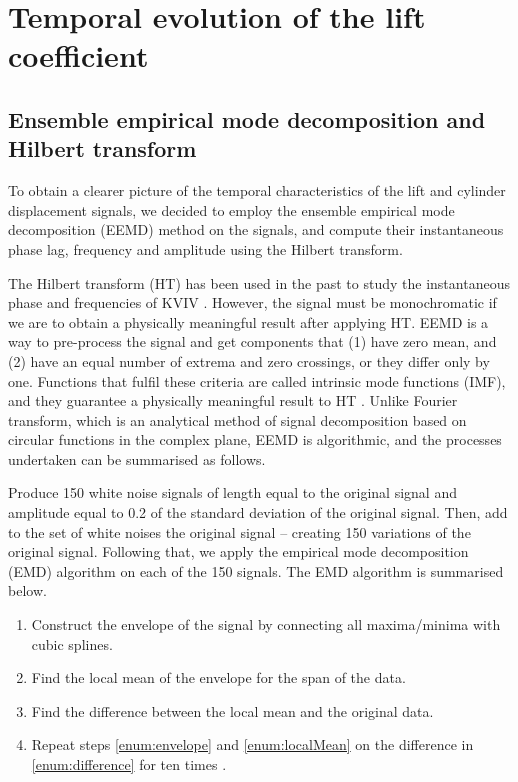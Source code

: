 \documentclass[oneside]{utmthesis}
\begin{document}
\chapter{Temporal evolution of the lift coefficient} \label{chap:tempEvo}

\section{Ensemble empirical mode decomposition and Hilbert transform} \label{sec:eemd}
To obtain a clearer picture of the temporal characteristics of the lift and cylinder displacement signals, we decided to employ the ensemble empirical mode decomposition (EEMD) method \citep{Huang1998,Wu2008} on the signals, and compute their instantaneous phase lag, frequency and amplitude using the Hilbert transform.

The Hilbert transform (HT) has been used in the past to study the instantaneous phase and frequencies of KVIV \citep{Khalak1999}. However, the signal must be monochromatic if we are to obtain a physically meaningful result after applying HT. EEMD is a way to pre-process the signal and get components that (1) have zero mean, and (2) have an equal number of extrema and zero crossings, or they differ only by one. Functions that fulfil these criteria are called intrinsic mode functions (IMF), and they guarantee a physically meaningful result to HT \citep{Gumelar2019,Zhou2019}. Unlike Fourier transform, which is an analytical method of signal decomposition based on circular functions in the complex plane, EEMD is algorithmic, and the processes undertaken can be summarised as follows.

Produce 150 white noise signals of length equal to the original signal and amplitude equal to 0.2 of the standard deviation of the original signal. Then, add to the set of white noises the original signal -- creating 150 variations of the original signal. Following that, we apply the empirical mode decomposition (EMD) algorithm on each of the 150 signals. The EMD algorithm is summarised below.

\begin{enumerate} \label{enumerate:emd}
  \item Construct the envelope of the signal by connecting all maxima/minima with cubic splines. \label{enum:envelope}
  \item Find the local mean of the envelope for the span of the data. \label{enum:localMean}
  \item Find the difference between the local mean and the original data. \label{enum:difference}
  \item Repeat steps \ref{enum:envelope} and \ref{enum:localMean} on the difference in \ref{enum:difference} for ten times \citep{Wu2008}.
\end{enumerate}
\end{document}
